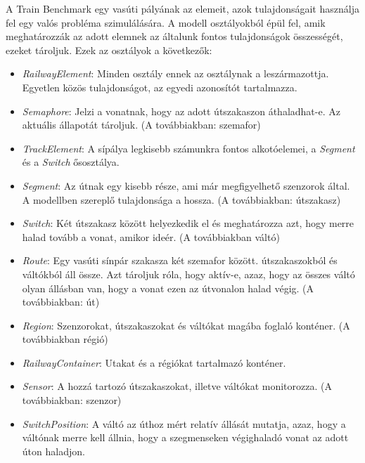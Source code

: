 A Train Benchmark egy vasúti pályának az elemeit, azok tulajdonságait használja fel egy valós probléma szimulálására. A modell osztályokból épül fel, amik meghatározzák az adott elemnek az általunk fontos tulajdonságok összességét, ezeket tároljuk. Ezek az osztályok a következők:
\begin{itemize}
	\item \emph{RailwayElement}: Minden osztály ennek az osztálynak a leszármazottja. Egyetlen közös tulajdonságot, az egyedi azonosítót tartalmazza.
	\item \emph{Semaphore}: Jelzi a vonatnak, hogy az adott útszakaszon áthaladhat-e. Az aktuális állapotát tároljuk. (A továbbiakban: szemafor)
	\item \emph{TrackElement}: A sípálya legkisebb számunkra fontos alkotóelemei, a \emph{Segment} és a \emph{Switch} ősosztálya.
	\item \emph{Segment}: Az útnak egy kisebb része, ami már megfigyelhető szenzorok által. A modellben szereplő tulajdonsága a hossza. (A továbbiakban: útszakasz)
	\item \emph{Switch}: Két útszakasz között helyezkedik el és meghatározza azt, hogy merre halad tovább a vonat, amikor ideér. (A továbbiakban váltó)
	\item \emph{Route}: Egy vasúti sínpár szakasza két szemafor között. útszakaszokból és váltókból áll össze. Azt tároljuk róla, hogy aktív-e, azaz, hogy az összes váltó olyan állásban van, hogy a vonat ezen az útvonalon halad végig. (A továbbiakban: út)
	\item \emph{Region}: Szenzorokat, útszakaszokat és váltókat magába foglaló konténer. (A továbbiakban régió)
	\item \emph{RailwayContainer}: Utakat és a régiókat tartalmazó konténer.
	\item \emph{Sensor}: A hozzá tartozó útszakaszokat, illetve váltókat monitorozza. (A továbbiakban: szenzor)
	\item \emph{SwitchPosition}: A váltó az úthoz mért relatív állását mutatja, azaz, hogy a váltónak merre kell állnia, hogy a szegmenseken végighaladó vonat az adott úton haladjon. 
\end{itemize}

